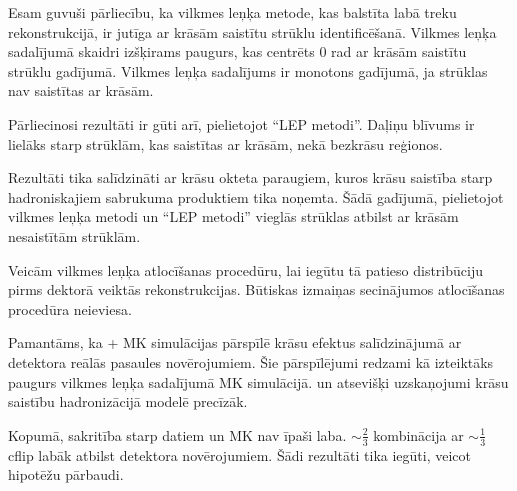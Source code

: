 Esam guvuši pārliecību, ka vilkmes leņķa metode, kas balstīta labā treku rekonstrukcijā, ir jutīga ar krāsām saistītu strūklu identificēšanā. Vilkmes leņķa sadalījumā skaidri izšķirams paugurs, kas centrēts 0 rad ar krāsām saistītu strūklu gadījumā. Vilkmes leņķa sadalījums ir monotons gadījumā, ja strūklas nav saistītas ar krāsām.

Pārliecinosi rezultāti ir gūti arī, pielietojot ``LEP metodi''. Daļiņu blīvums ir lielāks starp strūklām, kas saistītas ar krāsām, nekā bezkrāsu reģionos. 

Rezultāti tika salīdzināti ar krāsu okteta \PW paraugiem, kuros krāsu saistība starp hadroniskajiem sabrukuma produktiem tika noņemta. Šādā gadījumā, pielietojot vilkmes leņķa metodi un ``LEP metodi'' vieglās strūklas atbilst ar krāsām nesaistītām strūklām. 

Veicām vilkmes leņķa atlocīšanas procedūru, lai iegūtu tā patieso distribūciju pirms dektorā veiktās rekonstrukcijas. Būtiskas izmaiņas secinājumos atlocīšanas procedūra neieviesa.

Pamantāms, ka \POWHEG + \PYTHIA MK simulācijas pārspīlē krāsu efektus salīdzinājumā ar detektora reālās pasaules novērojumiem. Šie pārspīlējumi redzami kā izteiktāks paugurs vilkmes leņķa sadalījumā MK simulācijā. \HERWIGpp un atsevišķi \PYTHIA uzskaņojumi krāsu saistību hadronizācijā modelē precīzāk.

Kopumā, sakritība starp datiem un MK nav īpaši laba. $\sim\frac{2}{3}$ \ttbar kombinācija ar $\sim\frac{1}{3}$ \ttbar cflip labāk atbilst detektora novērojumiem. Šādi rezultāti tika iegūti, veicot hipotēžu pārbaudi.
